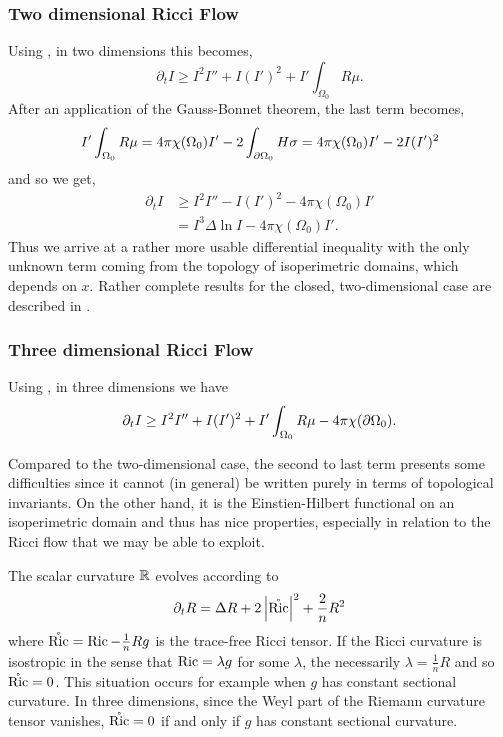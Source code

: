 \documentclass{amsart}
\begin{document}
\subsubsection*{Two dimensional Ricci Flow}

Using , in two dimensions this becomes,
\[
\partial_t I \geq I^2I'' + I(I')^2 + I'\int_{\Omega_0} R \mu.
\]
After an application of the Gauss-Bonnet theorem, the last term becomes,
\[
I'\int_{\Omega_0} R \mu = 4\pi\chi(\Omega_0)I' - 2\int_{\partial {\Omega_0}} H \sigma = 4\pi\chi(\Omega_0)I'- 2 I (I')^2
\]
and so we get,
\begin{equation}
\label{eq:2d_viscosity_ricciflow}
\begin{split}
\partial_t I &\geq I^2I'' - I(I')^2 - 4\pi\chi(\Omega_0)I' \\
&= I^3 \Delta \ln I - 4\pi\chi(\Omega_0)I'.
\end{split}
\end{equation}
Thus we arrive at a rather more usable differential inequality with the only unknown term coming from the topology of isoperimetric domains, which depends on \(x\). Rather complete results for the closed, two-dimensional case are described in \cite{Bryan:/2016,AndrewsBryan:/2010}.

\subsubsection*{Three dimensional Ricci Flow}

Using , in three dimensions we have
\begin{equation}
\label{eq:3d_viscosity_ricciflow}
\partial_t I \geq I^2I'' + I(I')^2 + I'\int_{\Omega_0} R \mu - 4\pi\chi(\partial {\Omega_0}).
\end{equation}

Compared to the two-dimensional case, the second to last term presents some difficulties since it cannot (in general) be written purely in terms of topological invariants. On the other hand, it is the Einstien-Hilbert functional on an isoperimetric domain and thus has nice properties, especially in relation to the Ricci flow that we may be able to exploit.

The scalar curvature \(\mathbb{R}\) evolves according to
\begin{equation}
\label{eq:dg_ricci_scalar}
\partial_t R = \Delta R + 2\left|{\mathring{{\operatorname{Ric}}}}\right|^2 + \frac{2}{n} R^2
\end{equation}
where \(\mathring{{\operatorname{Ric}}} = \operatorname{Ric} - \tfrac{1}{n} R g\) is the trace-free Ricci tensor. If the Ricci curvature is isostropic in the sense that \(\operatorname{Ric} = \lambda g\) for some \(\lambda\), the necessarily \(\lambda = \tfrac{1}{n} R\) and so \(\mathring{{\operatorname{Ric}}} = 0\). This situation occurs for example when \(g\) has constant sectional curvature. In three dimensions, since the Weyl part of the Riemann curvature tensor vanishes, \(\mathring{{\operatorname{Ric}}} = 0\) if and only if \(g\) has constant sectional curvature.
\end{document}
